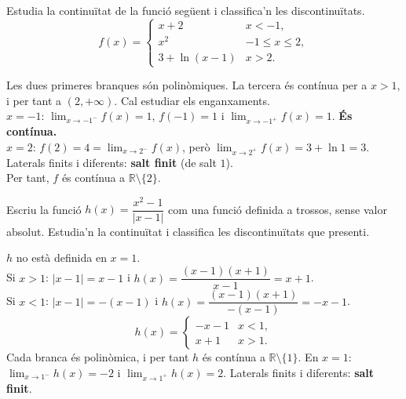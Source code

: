 \begin{apartats}

Estudia la continuïtat de la funció següent i classifica'n les discontinuïtats.
\[
f(x)=\begin{cases}
  x+2 & \si{x<-1},\\[3pt]
  x^2 & \si{-1\le x\le 2},\\[3pt]
  3+\ln(x-1) & \si{x>2}.
\end{cases}
\]

\begin{solucio}
Les dues primeres branques són polinòmiques. La tercera és contínua per a $x>1$, i per
tant a $(2,+\infty)$. Cal estudiar els enganxaments.\\
$x=-1$: $\lim_{x\to-1^-}f(x)=1$, $f(-1)=1$ i $\lim_{x\to-1^+}f(x)=1$. \textbf{És contínua.}\\
$x=2$: $f(2)=4=\lim_{x\to2^-}f(x)$, però $\lim_{x\to2^+}f(x)=3+\ln1=3$.
Laterals finits i diferents: \textbf{salt finit} (de salt $1$).\\
Per tant, $f$ és contínua a $\mathbb{R}\setminus\{2\}$.
\end{solucio}

Escriu la funció $h(x)=\dfrac{x^2-1}{|x-1|}$ com una funció definida a trossos, sense
valor absolut. Estudia'n la continuïtat i classifica les discontinuïtats que presenti.

\begin{solucio}
$h$ no està definida en $x=1$.\\
Si $x>1$: $|x-1|=x-1$ i $h(x)=\dfrac{(x-1)(x+1)}{x-1}=x+1$.\\
Si $x<1$: $|x-1|=-(x-1)$ i $h(x)=\dfrac{(x-1)(x+1)}{-(x-1)}=-x-1$.
\[
h(x)=\begin{cases} -x-1 & \si{x<1},\\ x+1 & \si{x>1}.\end{cases}
\]
Cada branca és polinòmica, i per tant $h$ és contínua a $\mathbb{R}\setminus\{1\}$.
En $x=1$: $\lim_{x\to1^-}h(x)=-2$ i $\lim_{x\to1^+}h(x)=2$. Laterals finits i
diferents: \textbf{salt finit}.
\end{solucio}

\end{apartats}
